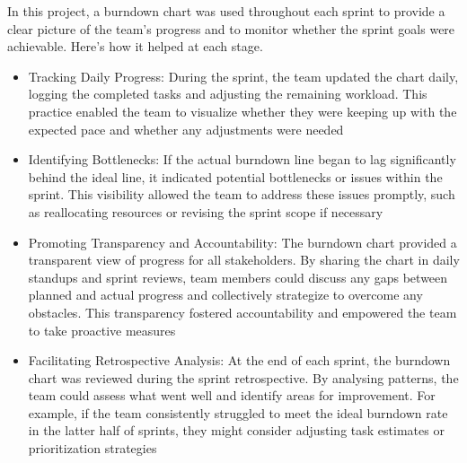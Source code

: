 \documentclass[11pt]{report}
\begin{document}
In this project, a burndown chart was used throughout each sprint to provide a clear picture of the team’s progress and to monitor whether the sprint goals were achievable. Here’s how it helped at each stage.
\begin{itemize}
    \item Tracking Daily Progress: During the sprint, the team updated the chart daily, logging the completed tasks and adjusting the remaining workload. This practice enabled the team to visualize whether they were  keeping up with the expected pace and whether any adjustments were needed  
    \item Identifying Bottlenecks: If the actual burndown line began to lag significantly behind the ideal line, it indicated potential bottlenecks or issues within the sprint. This visibility allowed the team to address these issues promptly, such as reallocating resources or revising the sprint scope if necessary 
   \item Promoting Transparency and Accountability: The burndown chart provided a transparent view of progress for all stakeholders. By sharing the chart in daily standups and sprint reviews, team members could discuss any gaps between planned and actual progress and collectively strategize to overcome any obstacles. This transparency fostered accountability and empowered the team to take proactive measures 
   \item Facilitating Retrospective Analysis: At the end of each sprint, the burndown chart was reviewed during the sprint retrospective. By analysing patterns, the team could assess what went well and identify areas for improvement. For example, if the team consistently struggled to meet the ideal burndown rate in the latter half of sprints, they might consider adjusting task estimates or prioritization strategies 
\end{itemize}
\end{document}
